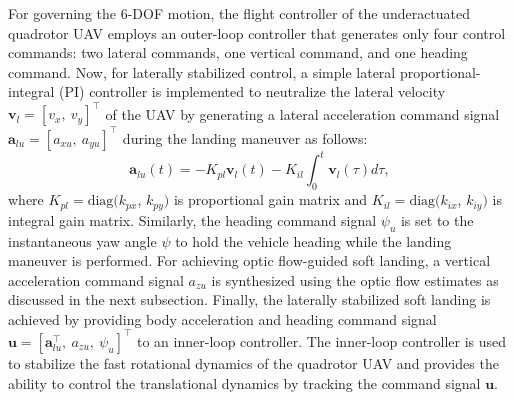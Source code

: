 \documentclass{IEEEtaes}
\begin{document}
For governing the 6-DOF motion, the flight controller of the underactuated quadrotor UAV employs an outer-loop controller that generates only four control commands: two lateral commands, one vertical command, and one heading command.
Now, for laterally stabilized control, a simple lateral proportional-integral (PI) controller is implemented to neutralize the lateral velocity $\boldsymbol{v}_{l} = [v_{x}, ~v_{y}]^\top$ of the UAV by generating a lateral acceleration command signal $\boldsymbol{a}_{lu} = [a_{xu}, ~a_{yu}]^\top$ during the landing maneuver as follows:
\begin{equation}
\label{lateral control signal: equation}
    \boldsymbol{a}_{lu}(t) = - K_{pl} \boldsymbol{v}_{l}(t) - K_{il} \int_0^t \boldsymbol{v}_{l}(\tau) d\tau,
\end{equation}
where $K_{pl} = \text{diag}(k_{px}$, $k_{py})$ is proportional gain matrix and $K_{il} = \text{diag}(k_{ix}$, $k_{iy})$ is integral gain matrix. 
Similarly, the heading command signal $\psi_u$ is set to the instantaneous yaw angle $\psi$ to hold the vehicle heading while the landing maneuver is performed.
For achieving optic flow-guided soft landing, a vertical acceleration command signal $a_{zu}$ is synthesized using the optic flow estimates as discussed in the next subsection.
Finally, the laterally stabilized soft landing is achieved by providing body acceleration and heading command signal $\boldsymbol{u} = [\boldsymbol{a}_{lu}^\top, ~a_{zu}, ~\psi_{u}]^\top$ to an inner-loop controller.
The inner-loop controller is used to stabilize the fast rotational dynamics of the quadrotor UAV and provides the ability to control the translational dynamics by tracking the command signal $\boldsymbol{u}$.
\end{document}
